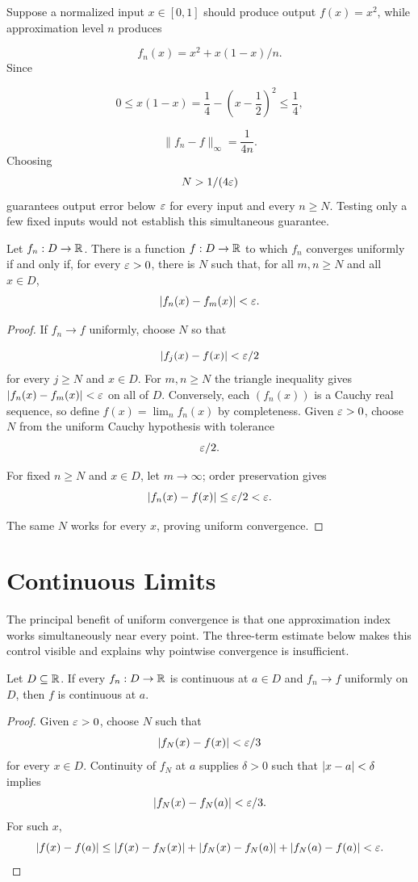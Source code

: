 \begin{example}
Suppose a normalized input $x\in[0,1]$ should produce output
$f(x)=x^2$, while approximation level $n$ produces

\[
f_n(x)=x^2+x(1-x)/n.
\]
 Since

\[
0\leq x(1-x)=\frac14-\left(x-\frac12\right)^2\leq\frac14,
\]

\[
\|f_n-f\|_\infty=\frac1{4n}.
\]
Choosing
\[
N>1/(4\varepsilon)
\]
 guarantees output error below $\varepsilon$ for
every input and every $n\geq N$. Testing only a few fixed inputs
would not establish this simultaneous guarantee.
\end{example}

\begin{proposition}
\label{prop:uniform-cauchy}
Let $f_n:D\to\mathbb{R}$. There is a function $f:D\to\mathbb{R}$ to which $f_n$ converges uniformly if and only if, for every $\varepsilon>0$, there is $N$ such that, for all $m,n\geq N$ and all $x\in D$,
\[
\lvert f_n(x)-f_m(x)\rvert<\varepsilon.
\]
\end{proposition}
\begin{proof}
If $f_n\to f$ uniformly, choose $N$ so that

\[
|f_j(x)-f(x)|<\varepsilon/2
\]
 for every $j\geq N$ and $x\in D$.
For $m,n\geq N$ the triangle inequality gives
$|f_n(x)-f_m(x)|<\varepsilon$ on all of $D$.
Conversely, each $(f_n(x))$ is a Cauchy real sequence, so define
$f(x)=\lim_n f_n(x)$ by completeness. Given $\varepsilon>0$, choose $N$
from the uniform Cauchy hypothesis with tolerance
\[
\varepsilon/2.
\]

For fixed $n\geq N$ and $x\in D$, let $m\to\infty$; order
preservation gives
\[
|f_n(x)-f(x)|\leq\varepsilon/2<\varepsilon.
\]

The same $N$ works for every $x$, proving uniform convergence.
\end{proof}

\section{Continuous Limits}

The principal benefit of uniform convergence is that one approximation index
works simultaneously near every point.  The three-term estimate below makes
this control visible and explains why pointwise convergence is insufficient.

\begin{theorem}
\label{thm:uniform-limit-continuity}
Let $D\subseteq\mathbb{R}$. If every $f_n:D\to\mathbb{R}$ is continuous at $a\in D$ and $f_n\to f$ uniformly on $D$, then $f$ is continuous at $a$.
\end{theorem}
\begin{proof}
Given $\varepsilon>0$, choose $N$ such that
\[
\lvert f_N(x)-f(x)\rvert<\varepsilon/3
\]
 for every $x\in D$. Continuity of $f_N$ at $a$ supplies $\delta>0$ such that $\lvert x-a\rvert<\delta$ implies
\[
\lvert f_N(x)-f_N(a)\rvert<\varepsilon/3.
\]
 For such $x$,
\[
\lvert f(x)-f(a)\rvert\leq\lvert f(x)-f_N(x)\rvert+\lvert f_N(x)-f_N(a)\rvert+\lvert f_N(a)-f(a)\rvert<\varepsilon.
\]
\end{proof}

